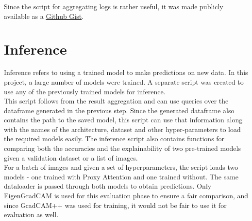 Since the script for aggregating logs is rather useful, it was made publicly available as a \href{https://gist.github.com/SubhadityaMukherjee/58cbdf324812175233e91993b720e0bc}{Github Gist}.

\section{Inference}
Inference refers to using a trained model to make predictions on new data. In this project, a large number of models were trained. A separate script was created to use any of the previously trained models for inference.\\
This script follows from the result aggregation and can use queries over the dataframe generated in the previous step. Since the generated dataframe also contains the path to the saved model, this script can use that information along with the names of the architecture, dataset and other hyper-parameters to load the required models easily.
The inference script also contains functions for comparing both the accuracies and the explainability of two pre-trained models given a validation dataset or a list of images.\\
For a batch of images and given a set of hyperparameters, the script loads two models - one trained with Proxy Attention and one trained without. The same dataloader is passed through both models to obtain predictions. Only EigenGradCAM is used for this evaluation phase to ensure a fair comparison, and since GradCAM++ was used for training, it would not be fair to use it for evaluation as well. 